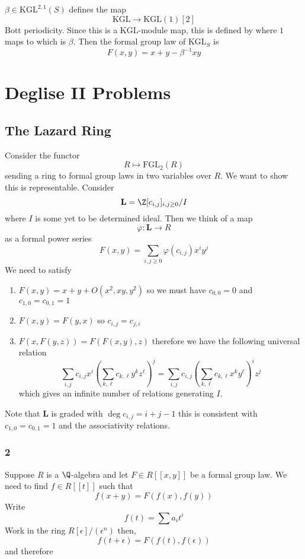 \documentclass{article}
\newcommand{\LL}{\mathbf{L}}
\begin{document}
\newcommand{\KGL}{\mathrm{KGL}}

\begin{example}
$\beta \in \KGL^{2,1}(S)$ defines the map
\[ \KGL \to \KGL(1)[2] \]
Bott periodicity. Since this is a $\KGL$-module map, this is defined by where $1$ maps to which is $\beta$. Then the formal group law of $\KGL_S$ is 
\[ F(x,y) = x + y - \beta^{-1} xy \]
\end{example}

\section{Deglise II Problems}

\subsection{The Lazard Ring}

\newcommand{\FGL}{\mathrm{FGL}}
Consider the functor
\[ R \mapsto \FGL_2(R) \]
sending a ring to formal group laws in two variables over $R$. We want to show this is representable. 
Consider
\[ \LL = \Z[c_{i,j}]_{i,j \ge 0} / I \]
where $I$ is some yet to be determined ideal. Then we think of a map
\[ \varphi : \LL \to R \]
as a formal power series
\[ F(x,y) = \sum_{i,j \ge 0} \varphi(c_{i,j}) x^i y^j \]
We need to satisfy
\begin{enumerate}
\item $F(x,y) = x + y + O(x^2, xy, y^2)$ so we must have $c_{0,0} = 0$ and $c_{1,0} = c_{0,1} = 1$ 
\item $F(x,y) = F(y,x)$ so $c_{i,j} = c_{j,i}$
\item $F(x, F(y,z)) = F(F(x,y), z)$ therefore we have the following universal relation
\[ \sum_{i,j} c_{i,j} x^i \left( \sum_{k,\ell} c_{k,\ell} y^k z^\ell \right)^j = \sum_{i,j} c_{i,j} \left( \sum_{k,\ell} c_{k,\ell} x^k y^{\ell} \right)^i z^j \]
which gives an infinite number of relations generating $I$.
\end{enumerate}

Note that $\LL$ is graded with $\deg{c_{i,j}} = i + j - 1$ this is consistent with $c_{1,0} = c_{0,1} = 1$ and the associativity relations. 

\subsubsection{2}

Suppose $R$ is a $\Q$-algebra and let $F \in R[[x,y]]$ be a formal group law. We need to find $f \in R[[t]]$ such that
\[ f(x + y) = F(f(x),f(y)) \]
Write
\[ f(t) = \sum a_i t^i \]
Work in the ring $R[\epsilon]/(\epsilon^n)$ then,
\[ f(t + \epsilon) = F(f(t), f(\epsilon)) \]
and therefore
\end{document}
